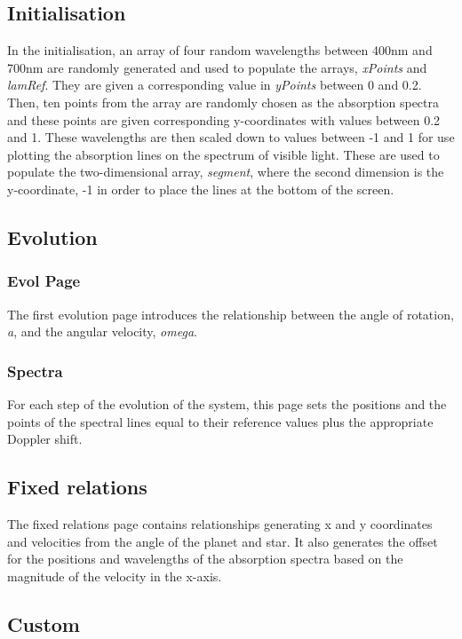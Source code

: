 \documentclass[11pt]{article}
\begin{document}
\subsection*{Initialisation}
\label{sec-3-2}

In the initialisation, an array of four random wavelengths between
400nm and 700nm are randomly generated and used to populate the
arrays, \emph{xPoints} and \emph{lamRef}. They are given a corresponding value
in \emph{yPoints} between 0 and 0.2. Then, ten points from the array are
randomly chosen as the absorption spectra and these points are given
corresponding y-coordinates with values between 0.2 and 1. These wavelengths are then scaled down to values
between -1 and 1 for use plotting the absorption lines on the spectrum
of visible light. These are used to populate the two-dimensional
array, \emph{segment}, where the second dimension is the y-coordinate, -1
in order to place the lines at the bottom of the screen.
\subsection*{Evolution}
\label{sec-3-3}
\subsubsection*{Evol Page}
\label{sec-3-3-1}

The first evolution page introduces the relationship between the angle of rotation, \emph{a}, and the angular velocity, \emph{omega}.
\subsubsection*{Spectra}
\label{sec-3-3-2}

For each step of the evolution of the system, this page sets the positions and the points of the spectral lines equal to their reference values plus the appropriate Doppler shift.
\subsection*{Fixed relations}
\label{sec-3-4}

The fixed relations page contains relationships generating x and y coordinates and velocities from the angle of the planet and star.
It also generates the offset for the positions and wavelengths of the absorption spectra based on the magnitude of the velocity in the x-axis.
\subsection*{Custom}
\label{sec-3-5}
\end{document}
